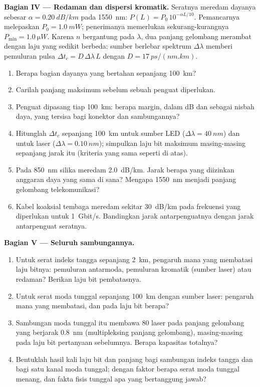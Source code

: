 \begin{problem}
\medskip
\noindent\textbf{Bagian IV --- Redaman dan dispersi kromatik.}
Seratnya meredam dayanya sebesar $\alpha = \qty{0.20}{dB/km}$ pada
\qty{1550}{nm}: $P(L) = P_0\,10^{-\alpha L/10}$. Pemancarnya
melepaskan $P_0 = \qty{1.0}{mW}$; penerimanya memerlukan sekurang-kurangnya
$P_{\min} = \qty{1.0}{\micro W}$. Karena $n$ bergantung pada $\lambda$, dua
panjang gelombang merambat dengan laju yang sedikit berbeda: sumber berlebar
spektrum $\Delta\lambda$ memberi pemuluran pulsa $\Delta t_c = D\,\Delta\lambda\,L$
dengan $D = \qty{17}{ps/(nm.km)}$.
\begin{enumerate}[resume]
  \item Berapa bagian dayanya yang bertahan sepanjang \qty{100}{km}?
  \item Carilah panjang maksimum sebelum sebuah penguat diperlukan.
  \item Penguat dipasang tiap \qty{100}{km}: berapa margin, dalam dB
        dan sebagai nisbah daya, yang tersisa bagi konektor dan
        sambungannya?
  \item Hitunglah $\Delta t_c$ sepanjang \qty{100}{km} untuk sumber LED
        ($\Delta\lambda = \qty{40}{nm}$) dan untuk laser
        ($\Delta\lambda = \qty{0.10}{nm}$); simpulkan laju bit maksimum
        masing-masing sepanjang jarak itu (kriteria yang sama seperti di atas).
  \item Pada \qty{850}{nm} silika meredam \qty{2.0}{dB/km}. Jarak berapa
        yang diizinkan anggaran daya yang sama di sana? Mengapa
        \qty{1550}{nm} menjadi panjang gelombang telekomunikasi?
  \item Kabel koaksial tembaga meredam sekitar \qty{30}{dB/km} pada
        frekuensi yang diperlukan untuk \qty{1}{Gbit/s}. Bandingkan
        jarak antarpenguatnya dengan jarak antarpenguat seratnya.
\end{enumerate}

\medskip
\noindent\textbf{Bagian V --- Seluruh sambungannya.}
\begin{enumerate}[resume]
  \item Untuk serat indeks tangga sepanjang \qty{2}{km}, pengaruh mana
        yang membatasi laju bitnya: pemuluran antarmoda, pemuluran
        kromatik (sumber laser) atau redaman? Berikan laju bit
        pembatasnya.
  \item Untuk serat moda tunggal sepanjang \qty{100}{km} dengan sumber
        laser: pengaruh mana yang membatasi, dan pada laju bit berapa?
  \item Sambungan moda tunggal itu membawa $80$ laser pada panjang
        gelombang yang berjarak \qty{0.8}{nm} (multipleksing panjang
        gelombang), masing-masing pada laju bit pertanyaan sebelumnya.
        Berapa kapasitas totalnya?
  \item Bentuklah hasil kali laju bit dan panjang bagi sambungan indeks
        tangga dan bagi satu kanal moda tunggal; dengan faktor berapa
        serat moda tunggal menang, dan fakta fisis tunggal apa yang
        bertanggung jawab?
\end{enumerate}
\end{problem}
